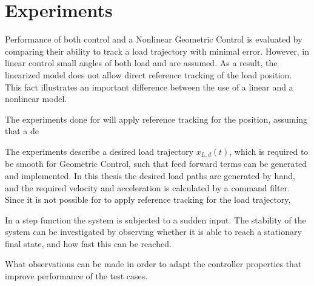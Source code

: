 
\section{Experiments}\label{sec:set.exp}
Performance of both  control and a Nonlinear Geometric Control is evaluated by comparing their ability to track a load trajectory with minimal error. 
However, in linear control small angles of both load and  are assumed. As a result, the linearized model does not allow direct reference tracking of the load position. This fact illustrates an important difference between the use of a linear and a nonlinear model. 


The experiments done for  will apply reference tracking for the  position, assuming that  a de

The experiments describe a desired load trajectory $ x_{L,d}(t) $, which is required to be smooth for Geometric Control, such that feed forward terms can be generated and implemented. In this thesis the desired load paths are generated by hand, and the required velocity and acceleration is calculated by a command filter. Since it is not possible for  to apply reference tracking for the load trajectory, 

In a step function the system is subjected to a sudden input. The stability of the system can be investigated by observing whether it is able to reach a stationary final state, and how fast this can be reached. 

What observations can be made in order to adapt the controller properties that improve performance of the test cases.

